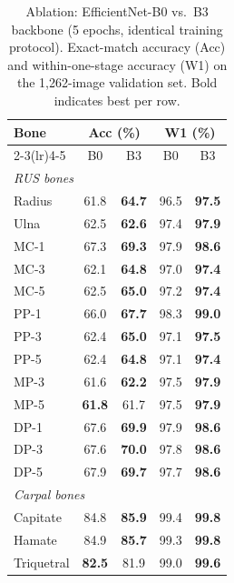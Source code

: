 \documentclass[journal]{IEEEtran}
\begin{document}
\begin{table}[!t]
\centering
\caption{Ablation: EfficientNet-B0 vs.\ B3 backbone (5 epochs,
identical training protocol). Exact-match accuracy (Acc) and
within-one-stage accuracy (W1) on the 1{,}262-image validation set.
Bold indicates best per row.}
\label{tab:ablation}
\small
\begin{tabular}{lcccc}
  \toprule
  \textbf{Bone} & \multicolumn{2}{c}{\textbf{Acc (\%)}} & \multicolumn{2}{c}{\textbf{W1 (\%)}} \\
  \cmidrule(lr){2-3}\cmidrule(lr){4-5}
  & B0 & B3 & B0 & B3 \\
  \midrule
  \multicolumn{5}{l}{\textit{RUS bones}} \\
  Radius       & 61.8  & \textbf{64.7}  & 96.5  & \textbf{97.5} \\
  Ulna         & 62.5    & \textbf{62.6}    & 97.4    & \textbf{97.9} \\
  MC-1         & 67.3     & \textbf{69.3}     & 97.9     & \textbf{98.6} \\
  MC-3         & 62.1     & \textbf{64.8}     & 97.0     & \textbf{97.4} \\
  MC-5         & 62.5     & \textbf{65.0}     & 97.2     & \textbf{97.4} \\
  PP-1         & 66.0     & \textbf{67.7}     & 98.3     & \textbf{99.0} \\
  PP-3         & 62.4     & \textbf{65.0}     & 97.1     & \textbf{97.5} \\
  PP-5         & 62.4     & \textbf{64.8}     & 97.1     & \textbf{97.4} \\
  MP-3         & 61.6     & \textbf{62.2}     & 97.5     & \textbf{97.9} \\
  MP-5         & \textbf{61.8}     & 61.7     & 97.5     & \textbf{97.9} \\
  DP-1         & 67.6     & \textbf{69.9}     & 97.9     & \textbf{98.6} \\
  DP-3         & 67.6     & \textbf{70.0}     & 97.8     & \textbf{98.6} \\
  DP-5         & 67.9     & \textbf{69.7}     & 97.7     & \textbf{98.6} \\
  \midrule
  \multicolumn{5}{l}{\textit{Carpal bones}} \\
  Capitate     & 84.8     & \textbf{85.9}     & 99.4     & \textbf{99.8} \\
  Hamate       & 84.9     & \textbf{85.7}     & 99.3     & \textbf{99.8} \\
  Triquetral   & \textbf{82.5}    & 81.9    & 99.0    & \textbf{99.6} \\

\end{tabular}
\end{table}
\end{document}

